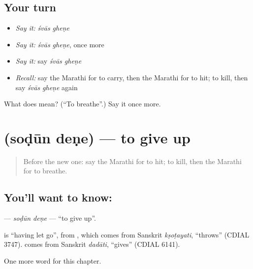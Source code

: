 \subsection*{Your turn}
\begin{itemize}
\raggedright
  \item \emph{Say it:} \emph{śvās gheṇe}
  \item \emph{Say it:} \emph{śvās gheṇe}, once more
  \item \emph{Say it:} say \emph{śvās gheṇe}
  \item \emph{Recall:} say the Marathi for to carry, then the Marathi for to hit; to kill, then say \emph{śvās gheṇe} again
\end{itemize}

\begin{tcolorbox}[breakable,colback=teal!4,colframe=teal!35!black,title={Before you move on}]
What does   mean? (\textquotedblleft{}To breathe\textquotedblright{}.) Say it once more.
\end{tcolorbox}
\section[\texorpdfstring{\mr{सोडून} \mr{देणे} (soḍūn deṇe)}{सोडून देणे (soḍūn deṇe)}]{  (soḍūn deṇe) — to give up}

\label{lesson:MR-C167-sodun-dene}



\begin{quote}
Before the new one: say the Marathi for to hit; to kill, then the Marathi for to breathe.
\end{quote}

\subsection*{You'll want to know:  }
\textbf{ } — \emph{soḍūn deṇe} — \textquotedblleft{}to give up\textquotedblright{}.

\begin{cousinweb}
\textbf{} is \textquotedblleft{}having let go\textquotedblright{}, from \textbf{}, which comes from Sanskrit \emph{kṣoṭayati}, \textquotedblleft{}throws\textquotedblright{} (CDIAL 3747). \textbf{} comes from Sanskrit \emph{dadāti}, \textquotedblleft{}gives\textquotedblright{} (CDIAL 6141).
\end{cousinweb}

\begin{grammarlens}[title={What you've built}]
One more word for this chapter.
\end{grammarlens}

